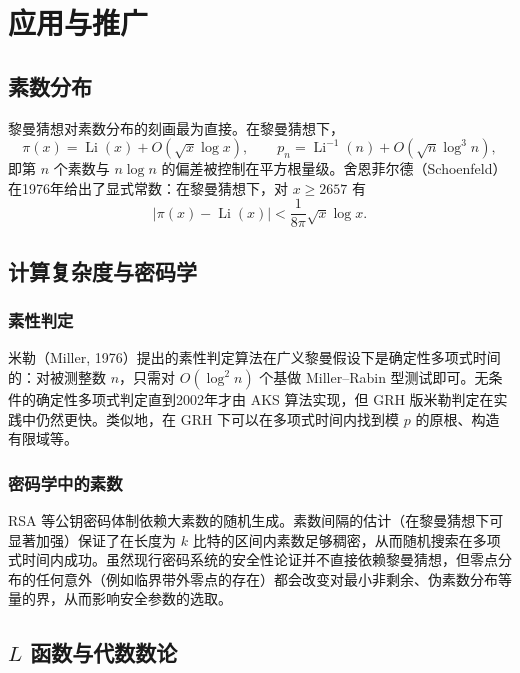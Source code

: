 \section{应用与推广}\label{sec:applications}

\subsection{素数分布}

黎曼猜想对素数分布的刻画最为直接。在黎曼猜想下，
\begin{equation}
    \pi(x) = \operatorname{Li}(x) + O(\sqrt{x} \log x), \qquad
    p_n = \operatorname{Li}^{-1}(n) + O(\sqrt{n} \log^3 n),
\end{equation}
即第 $n$ 个素数与 $n \log n$ 的偏差被控制在平方根量级。舍恩菲尔德（Schoenfeld）在1976年给出了显式常数\cite{schoenfeld1976sharper}：在黎曼猜想下，对 $x \ge 2657$ 有
\begin{equation}
    |\pi(x) - \operatorname{Li}(x)| < \frac{1}{8\pi} \sqrt{x} \log x.
\end{equation}

\subsection{计算复杂度与密码学}

\subsubsection{素性判定}

米勒（Miller, 1976）提出的素性判定算法在广义黎曼假设下是确定性多项式时间的\cite{miller1976riemann}：对被测整数 $n$，只需对 $O(\log^2 n)$ 个基做 Miller--Rabin 型测试即可。无条件的确定性多项式判定直到2002年才由 AKS 算法实现，但 GRH 版米勒判定在实践中仍然更快。类似地，在 GRH 下可以在多项式时间内找到模 $p$ 的原根、构造有限域等。

\subsubsection{密码学中的素数}

RSA 等公钥密码体制依赖大素数的随机生成。素数间隔的估计（在黎曼猜想下可显著加强）保证了在长度为 $k$ 比特的区间内素数足够稠密，从而随机搜索在多项式时间内成功。虽然现行密码系统的安全性论证并不直接依赖黎曼猜想，但零点分布的任何意外（例如临界带外零点的存在）都会改变对最小非剩余、伪素数分布等量的界，从而影响安全参数的选取。

\subsection{$L$ 函数与代数数论}

